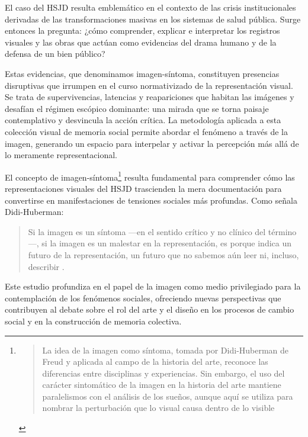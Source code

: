 El caso del HSJD resulta emblemático en el contexto de las crisis institucionales derivadas de las transformaciones masivas en los sistemas de salud pública. Surge entonces la pregunta: ¿cómo comprender, explicar e interpretar los registros visuales y las obras que actúan como evidencias del drama humano y de la defensa de un bien público?

\textcolor{edit30sept}{Estas evidencias, que denominamos imagen-síntoma, constituyen presencias disruptivas que irrumpen en el curso \textcolor{edit30sept}{normativizado} de la representación visual. Se trata de supervivencias, latencias y reapariciones que habitan las imágenes y desafían el régimen escópico dominante: una mirada que se torna paisaje contemplativo y desvincula la acción crítica. La metodología aplicada a esta colección visual de memoria social permite abordar el fenómeno a través de la imagen, generando un espacio para interpelar y activar la percepción más allá de lo meramente representacional.}

El concepto de imagen-síntoma\footnote{\begin{quote}La idea de la imagen como síntoma, tomada por Didi-Huberman de Freud y aplicada al campo de la historia del arte, reconoce las diferencias entre disciplinas y experiencias. Sin embargo, el uso del carácter sintomático de la imagen en la historia del arte mantiene paralelismos con el análisis de los sueños, aunque aquí se utiliza para nombrar la perturbación que lo visual causa dentro de lo visible \parencite[p. 37]{VegaArevalo2017}\end{quote}} resulta fundamental para comprender cómo las representaciones visuales del HSJD trascienden la mera documentación para convertirse en manifestaciones de tensiones sociales más profundas. Como señala Didi-Huberman:

\begin{quote}
Si la imagen es un síntoma —en el sentido crítico y no clínico del término—, si la imagen es un malestar en la representación, es porque indica un futuro de la representación, un futuro que no sabemos aún leer ni, incluso, describir \parencite[p. 177]{DidiHuberman2011}.
\end{quote}

Este estudio profundiza en el papel de la imagen como medio privilegiado para la contemplación de los fenómenos sociales, ofreciendo nuevas perspectivas que contribuyen al debate sobre el rol del arte y el diseño en los procesos de cambio social y en la construcción de memoria colectiva.

